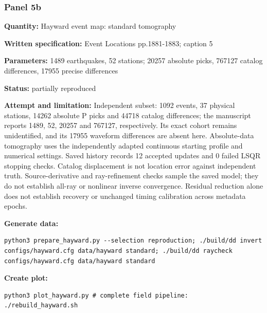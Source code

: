 \subsubsection*{Panel 5b}
\noindent\textbf{Quantity:} Hayward event map: standard tomography\par
\noindent\textbf{Written specification:} Event Locations pp.1881-1883; caption 5\par
\noindent\textbf{Parameters:} 1489 earthquakes, 52 stations; 20257 absolute picks, 767127 catalog differences, 17955 precise differences\par
\noindent\textbf{Status:} partially reproduced\par
\noindent\textbf{Attempt and limitation:} Independent subset: 1092 events, 37 physical stations, 14262 absolute P picks and 44718 catalog differences; the manuscript reports 1489, 52, 20257 and 767127, respectively. Its exact cohort remains unidentified, and its 17955 waveform differences are absent here. Absolute-data tomography uses the independently adapted continuous starting profile and numerical settings. Saved history records 12 accepted updates and 0 failed LSQR stopping checks. Catalog displacement is not location error against independent truth. Source-derivative and ray-refinement checks sample the saved model; they do not establish all-ray or nonlinear inverse convergence. Residual reduction alone does not establish recovery or unchanged timing calibration across metadata epochs.\par
\noindent\textbf{Generate data:}
\begin{lstlisting}
python3 prepare_hayward.py --selection reproduction; ./build/dd invert configs/hayward.cfg data/hayward standard; ./build/dd raycheck configs/hayward.cfg data/hayward standard
\end{lstlisting}
\noindent\textbf{Create plot:}
\begin{lstlisting}
python3 plot_hayward.py # complete field pipeline: ./rebuild_hayward.sh
\end{lstlisting}
